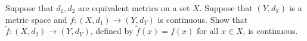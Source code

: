 \documentclass[11pt,letterpaper]{article}
\newenvironment{prob}[1]
  {\renewcommand\theinnerprob{#1}\innerprob}
  {\endinnerprob}
\newenvironment{solution}
  {\renewcommand\qedsymbol{}\begin{proof}[Solution]}
  {\end{proof}\bigskip}
\begin{document}
\begin{prob}{8}  %
	Suppose that $d_1, d_2$ are equivalent metrics on a set $X$.  Suppose that $(Y,d_Y)$ is a metric space and $f: (X,d_1) \to (Y, d_Y)$ is continuous.  Show that $\tilde f: (X,d_2) \to (Y,d_Y)$, defined by $\tilde f(x) = f(x)$ for all $x\in X$, is continuous.
\end{prob}
\end{document}
